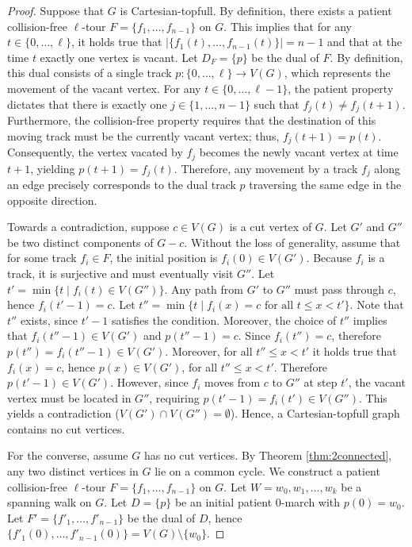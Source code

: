 \documentclass{article}
\begin{document}
\begin{proof}
Suppose that $G$ is Cartesian-topfull. By definition, there exists a patient collision-free $\ell$-tour $F = \{f_1, \ldots, f_{n-1}\}$ on $G$. This implies that for any $t \in \{0, \ldots, \ell\}$, it holds true that $|\{f_1(t), \ldots, f_{n-1}(t)\}|=n-1$ and that at the time $t$ exactly one vertex is vacant. Let $D_F=\{p\}$ be the dual of $F$. By definition, this dual consists of a single track $p: \{0, \ldots, \ell\} \rightarrow V(G)$, which represents the movement of the vacant vertex. For any $t \in \{0, \ldots, \ell-1\}$, the patient property dictates that there is exactly one $j \in \{1, \ldots, n-1\}$ such that $f_j(t) \neq f_j(t+1)$. Furthermore, the collision-free property requires that the destination of this moving track must be the currently vacant vertex; thus, $f_j(t+1) = p(t)$. Consequently, the vertex vacated by $f_j$ becomes the newly vacant vertex at time $t+1$, yielding $p(t+1) = f_j(t)$. Therefore, any movement by a track $f_j$ along an edge precisely corresponds to the dual track $p$ traversing the same edge in the opposite direction.

Towards a contradiction, suppose $c \in V(G)$ is a cut vertex of $G$. Let $G'$ and $G''$ be two distinct components of $G-c$. Without the loss of generality, assume that for some track $f_i \in F$, the initial position is $f_i(0) \in V(G')$. Because $f_i$ is a track, it is surjective and must eventually visit $G''$. Let $t' = \min\{t \mid f_i(t) \in V(G'')\}$. Any path from $G'$ to $G''$ must pass through $c$, hence $f_i(t'-1) = c$. Let $t''=\min\{t \mid f_i(x)=c \text{ for all } t\leq x<t'\}$. Note that $t''$ exists, since $t'-1$ satisfies the condition. Moreover, the choice of $t''$ implies that $f_i(t''-1)\in V(G')$ and $p(t''-1)=c$. Since $f_i(t'')=c$, therefore $p(t'')=f_i(t''-1) \in V(G')$. Moreover, for all $t'' \leq x<t'$ it holds true that $f_i(x)=c$, hence $p(x)\in V(G')$, for all $t'' \leq x<t'$.
Therefore $p(t'-1) \in V(G')$. However, since $f_i$ moves from $c$ to $G''$ at step $t'$, the vacant vertex must be located in $G''$, requiring $p(t'-1) = f_i(t') \in V(G'')$. This yields a contradiction ($V(G') \cap V(G'') = \emptyset$). Hence, a Cartesian-topfull graph contains no cut vertices.

For the converse, assume $G$ has no cut vertices. By Theorem \ref{thm:2connected}, any two distinct vertices in $G$ lie on a common cycle. We construct a patient collision-free $\ell$-tour $F = \{f_1, \ldots, f_{n-1}\}$ on $G$. Let $W = w_0, w_1, \ldots, w_k$ be a spanning walk on $G$. Let $D=\{p\}$ be an initial patient $0$-march with $p(0) = w_0$. Let $F'=\{f'_1, \ldots, f'_{n-1}\}$ be the dual of $D$, hence $\{f'_1(0), \ldots, f'_{n-1}(0)\} = V(G)\setminus \{w_0\}$.


\end{proof}
\end{document}
